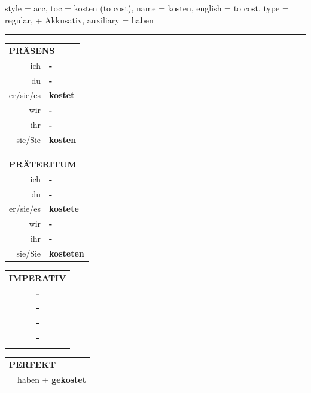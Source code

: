\begin{verbentry}{
  style = {acc},
  toc = {kosten (to cost)},
  name = {kosten},
  english = {to cost},
  type = {regular, + Akkusativ},
  auxiliary = {haben}
}
 
    
     \vspace{5pt}

    \hrule
    
    \vspace{5pt}

  \begin{tabular}{rl}
     \multicolumn{2}{l}{\textbf{PRÄSENS} }\\
    ich & \textbf{-}\\
    du & \textbf{-}\\
    er/sie/es & \textbf{kostet}\\
    wir & \textbf{-}\\
    ihr & \textbf{-}\\
    sie/Sie & \textbf{kosten}\\
  \end{tabular}
  \hfill
     \begin{tabular}{rl}
    \multicolumn{2}{l}{\textbf{PRÄTERITUM} }\\
    ich & \textbf{-}\\
    du & \textbf{-}\\
    er/sie/es & \textbf{kostete}\\
    wir & \textbf{-}\\
    ihr & \textbf{-}\\
    sie/Sie & \textbf{kosteten}\\
  \end{tabular}
  \hfill
  \begin{tabular}{rl}
     \multicolumn{2}{l}{\textbf{IMPERATIV} }\\
   & \textbf{-}\\
   & \textbf{-}\\
   & \textbf{-}\\
   & \textbf{-}\\
   & \vspace{10pt}
  \end{tabular}

    \vspace{10pt}

 \begin{tabular}{rl}
     \multicolumn{2}{l}{\textbf{PERFEKT}}\\
   & haben + \textbf{gekostet}\\
  \end{tabular}
\hfill
   \begin{tabular}{rl}
   

\end{tabular}
\end{verbentry}
